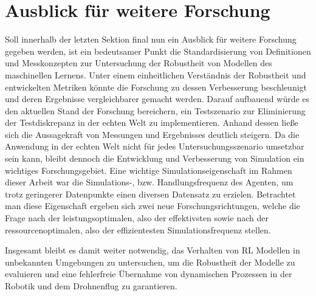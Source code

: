 \section{Ausblick für weitere Forschung}

Soll innerhalb der letzten Sektion final nun ein Ausblick für weitere Forschung gegeben werden, ist ein bedeutsamer Punkt die Standardisierung von Definitionen und Messkonzepten zur Untersuchung der Robustheit von Modellen des maschinellen Lernens.
Unter einem einheitlichen Verständnis der Robustheit und entwickelten Metriken könnte die Forschung zu dessen Verbesserung beschleunigt und deren Ergebnisse vergleichbarer gemacht werden.
Darauf aufbauend würde es den aktuellen Stand der Forschung bereichern, ein Testszenario zur Eliminierung der Testdiskrepanz in der echten Welt zu implementieren. %
Anhand dessen ließe sich die Aussagekraft von Messungen und Ergebnisses deutlich steigern.
Da die Anwendung in der echten Welt nicht für jedes Untersuchungsszenario umsetzbar sein kann, bleibt dennoch die Entwicklung und Verbesserung von Simulation ein wichtiges Forschungsgebiet.
Eine wichtige Simulationseigenschaft im Rahmen dieser Arbeit war die Simulations-, bzw. Handlungsfrequenz des Agenten, um trotz geringerer Datenpunkte einen diversen Datensatz zu erzielen.
Betrachtet man diese Eigenschaft ergeben sich zwei neue Forschungsrichtungen, welche die Frage nach der leistungsoptimalen, also der effektivsten sowie nach der ressourcenoptimalen, also der effizientesten Simulationsfrequenz stellen.

Insgesamt bleibt es damit weiter notwendig, das Verhalten von RL Modellen in unbekannten Umgebungen zu untersuchen, um die Robustheit der Modelle zu evaluieren und eine fehlerfreie Übernahme von dynamischen Prozessen in der Robotik und dem Drohnenflug zu garantieren.